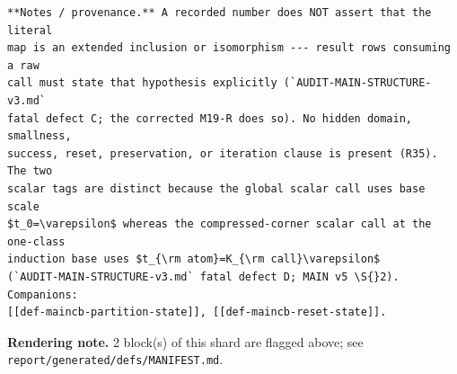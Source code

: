 \begin{defnote}
\begin{verbatim}
**Notes / provenance.** A recorded number does NOT assert that the literal
map is an extended inclusion or isomorphism --- result rows consuming a raw
call must state that hypothesis explicitly (`AUDIT-MAIN-STRUCTURE-v3.md`
fatal defect C; the corrected M19-R does so). No hidden domain, smallness,
success, reset, preservation, or iteration clause is present (R35). The two
scalar tags are distinct because the global scalar call uses base scale
$t_0=\varepsilon$ whereas the compressed-corner scalar call at the one-class
induction base uses $t_{\rm atom}=K_{\rm call}\varepsilon$
(`AUDIT-MAIN-STRUCTURE-v3.md` fatal defect D; MAIN v5 \S{}2). Companions:
[[def-maincb-partition-state]], [[def-maincb-reset-state]].
\end{verbatim}
\par
\textbf{Rendering note.} 2 block(s) of this shard are flagged above; see \texttt{report/generated/defs/MANIFEST.md}.
\end{defnote}

